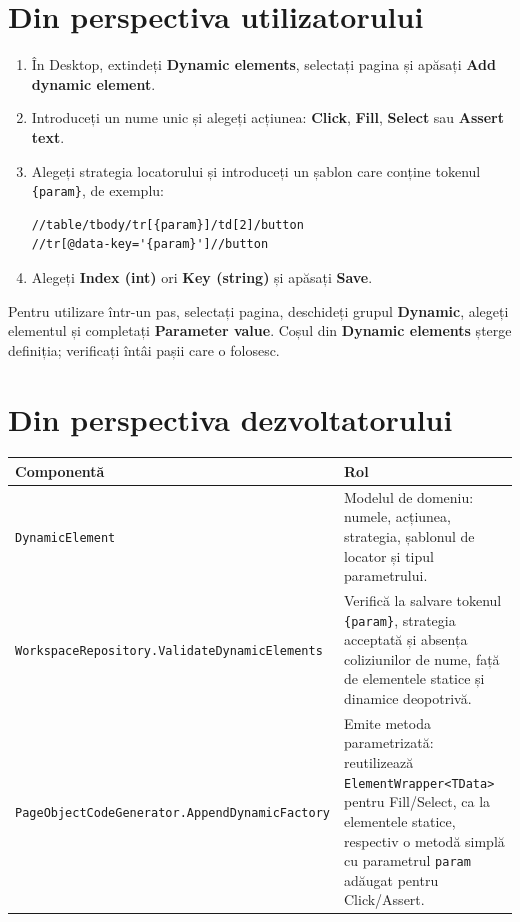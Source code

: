 \documentclass[12pt,a4paper]{report}
\newcommand{\UI}[1]{\textbf{#1}}
\newcommand{\File}[1]{\nolinkurl{#1}}
\begin{document}
\section{Din perspectiva utilizatorului}

\begin{enumerate}
  \item În Desktop, extindeți \UI{Dynamic elements}, selectați pagina și apăsați \UI{Add dynamic element}.
  \item Introduceți un nume unic și alegeți acțiunea: \UI{Click}, \UI{Fill}, \UI{Select} sau \UI{Assert text}.
  \item Alegeți strategia locatorului și introduceți un șablon care conține tokenul \File{\{param\}}, de exemplu:
\begin{lstlisting}
//table/tbody/tr[{param}]/td[2]/button
//tr[@data-key='{param}']//button
\end{lstlisting}
  \item Alegeți \UI{Index (int)} ori \UI{Key (string)} și apăsați \UI{Save}.
\end{enumerate}

Pentru utilizare într-un pas, selectați pagina, deschideți grupul \UI{Dynamic}, alegeți elementul și completați \UI{Parameter value}. Coșul din \UI{Dynamic elements} șterge definiția; verificați întâi pașii care o folosesc.

\section{Din perspectiva dezvoltatorului}

\begin{tabularx}{\textwidth}{@{}p{5.3cm}Y@{}}
\toprule \textbf{Componentă} & \textbf{Rol} \\
\midrule
\File{DynamicElement} & Modelul de domeniu: numele, acțiunea, strategia, șablonul de locator și tipul parametrului. \\
\File{WorkspaceRepository.ValidateDynamicElements} & Verifică la salvare tokenul \File{\{param\}}, strategia acceptată și absența coliziunilor de nume, față de elementele statice și dinamice deopotrivă. \\
\File{PageObjectCodeGenerator.AppendDynamicFactory} & Emite metoda parametrizată: reutilizează \File{ElementWrapper<TData>} pentru Fill/Select, ca la elementele statice, respectiv o metodă simplă cu parametrul \File{param} adăugat pentru Click/Assert. \\
\bottomrule
\end{tabularx}
\end{document}

